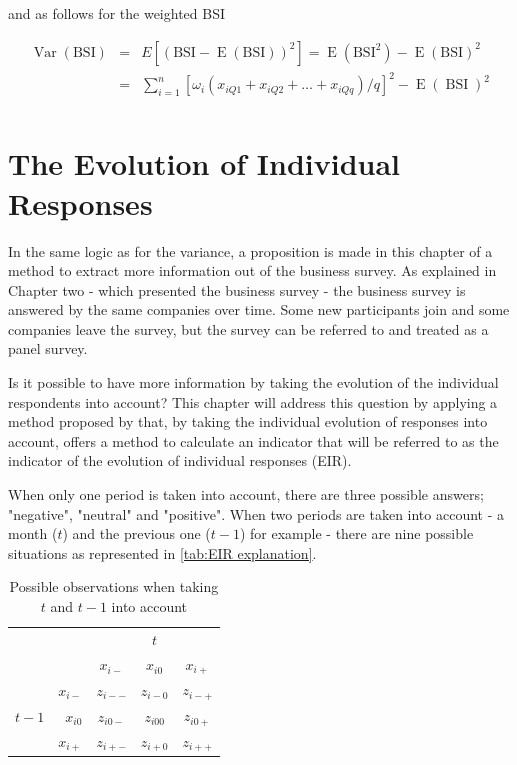 \documentclass[12pt,a4paper,oneside]{book}
\DeclareMathOperator{\Var}{Var}
\DeclareMathOperator{\E}{E}
\DeclareMathOperator{\BSI}{BSI}
\begin{document}
and as follows for the weighted BSI

\begin{eqnarray}
         \Var(\text{BSI}) &=& E \left[ \left(\text{BSI}-\E(\text{BSI}) \right)^2 \right] =  \E \left( \text{BSI}^2\right) - \E \left( \text{BSI}\right)^2 \\ 
         &=&  \sum^n_{i=1} \left[\omega_i (x_{iQ1} + x_{iQ2} + \ldots + x_{iQq})/q \right]^2 - \E (\BSI)^2 \\ \nonumber
\end{eqnarray}


\chapter{The Evolution of Individual Responses}

In the same logic as for the variance, a proposition is made in this chapter of a method to extract more information out of the business survey. 
As explained in Chapter two - which presented the business survey - the business survey is answered by the same companies over time. Some new participants join and some companies leave the survey, but the survey can be referred to and treated as a panel survey.

Is it possible to have more information by taking the evolution of the individual respondents into account? 
This chapter will address this question by applying a method proposed by \cite{caron_estimation_1996} that, by taking the individual evolution of responses into account, offers a method to calculate an indicator that will be referred to as the indicator of the evolution of individual responses (EIR).

When only one period is taken into account, there are three possible answers; "negative", "neutral" and "positive".
When two periods are taken into account - a month ($t$) and the previous one ($t-1$) for example - there are nine possible situations as represented in \autoref{tab:EIR explanation}. 


\begin{table}[htp!]
    \caption{Possible observations when taking $t$ and $t-1$ into account}
    \label{tab:EIR explanation}
     \centering \footnotesize
    \begin{tabular}{r | r | c c c | }
    \multicolumn{1}{r}{} & \multicolumn{1}{r}{} &    \multicolumn{3}{c}{$t$} \\ \cline{3-5}
    \multicolumn{1}{r}{} &         & \textbf{$x_{i-}$} & \textbf{$x_{i0}$} & \textbf{$x_{i+}$} \\ \cline{2-5}
          &    \textbf{$x_{i-}$} & $z_{i--}$    & $z_{i-0}$    & $z_{i-+}$ \\ 
    $t-1$ & \textbf{$x_{i0}$}  & $z_{i0-}$    & $z_{i00}$    & $z_{i0+}$ \\
          &    \textbf{$x_{i+}$} & $z_{i+-}$    & $z_{i+0}$    & $z_{i++}$ \\ \cline{2-5}
    \end{tabular}
\end{table}
\end{document}
